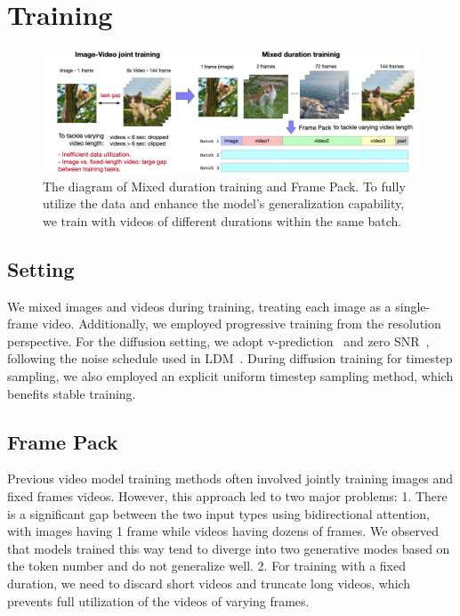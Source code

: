 \section{Training}

\begin{figure}[ht]
\begin{center}
\includegraphics[width=\linewidth]{images/CogVideoX.png}
\end{center}
\caption{
The diagram of Mixed duration training and Frame Pack. To fully utilize the data and enhance the model's generalization capability, we train with videos of different durations within the same batch.}
\label{fig:framepack}
\end{figure}

\subsection{Setting}
We mixed images and videos during training, treating each image as a single-frame video. Additionally, we employed progressive training from the resolution perspective. For the diffusion setting, we adopt v-prediction~\citep{salimans2022progressive} and zero SNR~\citep{lin2024common}, following the noise schedule used in LDM~\citep{rombach2022high}.
During diffusion training for timestep sampling, we also employed an explicit uniform timestep sampling method, which benefits stable training. 

\subsection{Frame Pack}
Previous video model training methods often involved jointly training images and fixed frames videos. However, this approach led to two major problems: 1. There is a significant gap between the two input types using bidirectional attention, with images having 1 frame while videos having dozens of frames. We observed that models trained this way tend to diverge into two generative modes based on the token number and do not generalize well. 2. For training with a fixed duration, we need to discard short videos and truncate long videos, which prevents full utilization of the videos of varying frames.

